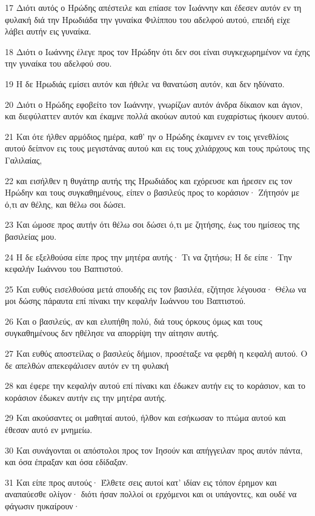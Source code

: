 \par 17 Διότι αυτός ο Ηρώδης απέστειλε και επίασε τον Ιωάννην και έδεσεν αυτόν εν τη φυλακή διά την Ηρωδιάδα την γυναίκα Φιλίππου του αδελφού αυτού, επειδή είχε λάβει αυτήν εις γυναίκα.
\par 18 Διότι ο Ιωάννης έλεγε προς τον Ηρώδην ότι δεν σοι είναι συγκεχωρημένον να έχης την γυναίκα του αδελφού σου.
\par 19 Η δε Ηρωδιάς εμίσει αυτόν και ήθελε να θανατώση αυτόν, και δεν ηδύνατο.
\par 20 Διότι ο Ηρώδης εφοβείτο τον Ιωάννην, γνωρίζων αυτόν άνδρα δίκαιον και άγιον, και διεφύλαττεν αυτόν και έκαμνε πολλά ακούων αυτού και ευχαρίστως ήκουεν αυτού.
\par 21 Και ότε ήλθεν αρμόδιος ημέρα, καθ' ην ο Ηρώδης έκαμνεν εν τοις γενεθλίοις αυτού δείπνον εις τους μεγιστάνας αυτού και εις τους χιλιάρχους και τους πρώτους της Γαλιλαίας,
\par 22 και εισήλθεν η θυγάτηρ αυτής της Ηρωδιάδος και εχόρευσε και ήρεσεν εις τον Ηρώδην και τους συγκαθημένους, είπεν ο βασιλεύς προς το κοράσιον· Ζήτησόν με ό,τι αν θέλης, και θέλω σοι δώσει.
\par 23 Και ώμοσε προς αυτήν ότι θέλω σοι δώσει ό,τι με ζητήσης, έως του ημίσεος της βασιλείας μου.
\par 24 Η δε εξελθούσα είπε προς την μητέρα αυτής· Τι να ζητήσω; Η δε είπε· Την κεφαλήν Ιωάννου του Βαπτιστού.
\par 25 Και ευθύς εισελθούσα μετά σπουδής εις τον βασιλέα, εζήτησε λέγουσα· Θέλω να μοι δώσης πάραυτα επί πίνακι την κεφαλήν Ιωάννου του Βαπτιστού.
\par 26 Και ο βασιλεύς, αν και ελυπήθη πολύ, διά τους όρκους όμως και τους συγκαθημένους δεν ηθέλησε να απορρίψη την αίτησιν αυτής.
\par 27 Και ευθύς αποστείλας ο βασιλεύς δήμιον, προσέταξε να φερθή η κεφαλή αυτού. Ο δε απελθών απεκεφάλισεν αυτόν εν τη φυλακή
\par 28 και έφερε την κεφαλήν αυτού επί πίνακι και έδωκεν αυτήν εις το κοράσιον, και το κοράσιον έδωκεν αυτήν εις την μητέρα αυτής.
\par 29 Και ακούσαντες οι μαθηταί αυτού, ήλθον και εσήκωσαν το πτώμα αυτού και έθεσαν αυτό εν μνημείω.
\par 30 Και συνάγονται οι απόστολοι προς τον Ιησούν και απήγγειλαν προς αυτόν πάντα, και όσα έπραξαν και όσα εδίδαξαν.
\par 31 Και είπε προς αυτούς· Έλθετε σεις αυτοί κατ' ιδίαν εις τόπον έρημον και αναπαύεσθε ολίγον· διότι ήσαν πολλοί οι ερχόμενοι και οι υπάγοντες, και ουδέ να φάγωσιν ηυκαίρουν·
